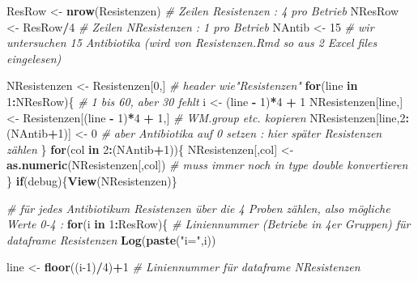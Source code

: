\documentclass[
]{article}
\newenvironment{Shaded}{\begin{snugshade}}{\end{snugshade}}
\newcommand{\CommentTok}[1]{\textcolor[rgb]{0.56,0.35,0.01}{\textit{#1}}}
\newcommand{\ControlFlowTok}[1]{\textcolor[rgb]{0.13,0.29,0.53}{\textbf{#1}}}
\newcommand{\DecValTok}[1]{\textcolor[rgb]{0.00,0.00,0.81}{#1}}
\newcommand{\KeywordTok}[1]{\textcolor[rgb]{0.13,0.29,0.53}{\textbf{#1}}}
\newcommand{\NormalTok}[1]{#1}
\newcommand{\OperatorTok}[1]{\textcolor[rgb]{0.81,0.36,0.00}{\textbf{#1}}}
\newcommand{\StringTok}[1]{\textcolor[rgb]{0.31,0.60,0.02}{#1}}
\begin{document}
\begin{Shaded}
\begin{Highlighting}[]
\NormalTok{ResRow  <-}\StringTok{ }\KeywordTok{nrow}\NormalTok{(Resistenzen)  }\CommentTok{# Zeilen Resistenzen : 4 pro Betrieb}
\NormalTok{NResRow <-}\StringTok{ }\NormalTok{ResRow}\OperatorTok{/}\DecValTok{4}           \CommentTok{# Zeilen NResistenzen : 1 pro Betrieb}
\NormalTok{NAntib  <-}\StringTok{ }\DecValTok{15}                 \CommentTok{# wir untersuchen 15 Antibiotika (wird von Resistenzen.Rmd so aus 2 Excel files eingelesen)}

\NormalTok{NResistenzen <-}\StringTok{ }\NormalTok{Resistenzen[}\DecValTok{0}\NormalTok{,]                          }\CommentTok{# header wie"Resistenzen"}
\ControlFlowTok{for}\NormalTok{(line }\ControlFlowTok{in} \DecValTok{1}\OperatorTok{:}\NormalTok{NResRow)\{                                  }\CommentTok{# 1 bis 60, aber 30 fehlt}
\NormalTok{  i <-}\StringTok{ }\NormalTok{(line }\OperatorTok{-}\StringTok{ }\DecValTok{1}\NormalTok{)}\OperatorTok{*}\DecValTok{4} \OperatorTok{+}\StringTok{ }\DecValTok{1}
\NormalTok{  NResistenzen[line,] <-}\StringTok{ }\NormalTok{Resistenzen[(line }\OperatorTok{-}\StringTok{ }\DecValTok{1}\NormalTok{)}\OperatorTok{*}\DecValTok{4} \OperatorTok{+}\StringTok{ }\DecValTok{1}\NormalTok{,]  }\CommentTok{# WM.group etc. kopieren}
\NormalTok{  NResistenzen[line,}\DecValTok{2}\OperatorTok{:}\NormalTok{(NAntib}\OperatorTok{+}\DecValTok{1}\NormalTok{)] <-}\StringTok{ }\DecValTok{0}                   \CommentTok{# aber Antibiotika auf 0 setzen : hier später Resistenzen zählen}
\NormalTok{\}}
\ControlFlowTok{for}\NormalTok{(col }\ControlFlowTok{in} \DecValTok{2}\OperatorTok{:}\NormalTok{(NAntib}\OperatorTok{+}\DecValTok{1}\NormalTok{))\{}
\NormalTok{  NResistenzen[,col] <-}\StringTok{  }\KeywordTok{as.numeric}\NormalTok{(NResistenzen[,col])  }\CommentTok{# muss immer noch in type double konvertieren}
\NormalTok{\}}
\ControlFlowTok{if}\NormalTok{(debug)\{}\KeywordTok{View}\NormalTok{(NResistenzen)\} }

\CommentTok{# für jedes Antibiotikum Resistenzen über die 4 Proben zählen, also mögliche Werte 0-4 :}
\ControlFlowTok{for}\NormalTok{(i }\ControlFlowTok{in} \DecValTok{1}\OperatorTok{:}\NormalTok{ResRow)\{                             }\CommentTok{# Liniennummer (Betriebe in 4er Gruppen) für dataframe Resistenzen}
  \KeywordTok{Log}\NormalTok{(}\KeywordTok{paste}\NormalTok{(}\StringTok{"i="}\NormalTok{,i))}
  
\NormalTok{  line <-}\StringTok{ }\KeywordTok{floor}\NormalTok{((i}\DecValTok{-1}\NormalTok{)}\OperatorTok{/}\DecValTok{4}\NormalTok{)}\OperatorTok{+}\DecValTok{1}                      \CommentTok{# Liniennummer für dataframe NResistenzen}
  

\end{Highlighting}
\end{Shaded}
\end{document}
